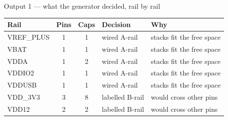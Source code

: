 \documentclass[aspectratio=169,10pt]{beamer}
\begin{document}
\begin{frame}{Output 1 --- what the generator decided, rail by rail}
\vspace{1mm}
\begin{center}\small
\begin{tabular}{@{}l c c l l@{}}
\toprule
\textbf{Rail} & \textbf{Pins} & \textbf{Caps} & \textbf{Decision} & \textbf{Why}\\
\midrule
VREF\_PLUS & 1 & 1 & wired A-rail & stacks fit the free space\\
VBAT       & 1 & 1 & wired A-rail & stacks fit the free space\\
VDDA       & 1 & 2 & wired A-rail & stacks fit the free space\\
VDDIO2     & 1 & 1 & wired A-rail & stacks fit the free space\\
VDDUSB     & 1 & 1 & wired A-rail & stacks fit the free space\\
\midrule
VDD\_3V3   & 3 & 8 & labelled B-rail & would cross other pins\\
VDD12      & 2 & 2 & labelled B-rail & would cross other pins\\
\bottomrule
\end{tabular}
\end{center}
\vspace{2mm}
\begin{center}
\end{center}
\end{frame}
\end{document}
